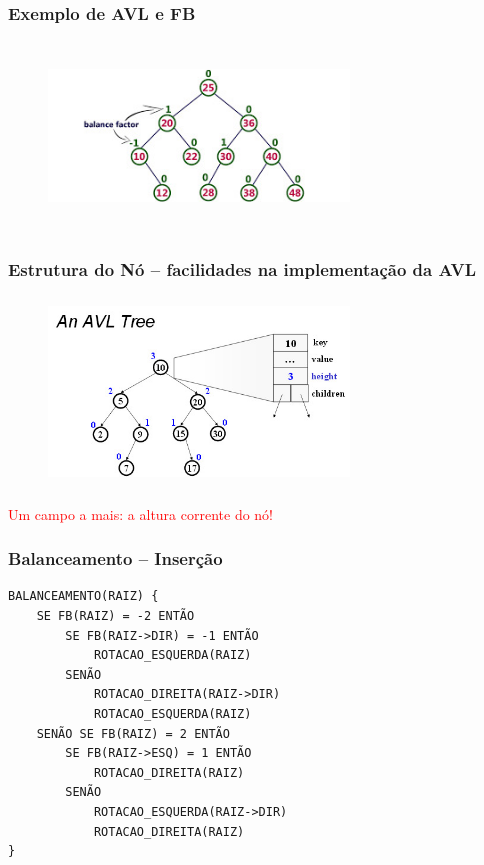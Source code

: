 

\begin{frame}[fragile]
  \frametitle{Exemplo de AVL e FB}
  
   \begin{figure}[tbp]
    \includegraphics[width=8cm, height=5cm]{figs/fig_arvores/AVL-tree-example_FB.jpg}
    \centering
    \end{figure}

 \end{frame}


\begin{frame}[fragile]
  \frametitle{Estrutura do Nó -- facilidades na implementação da AVL}
  
   \begin{figure}[tbp]
    \includegraphics[width=8cm, height=5cm]{figs/fig_arvores/AVL-data_structure.jpg}
    \centering
    \end{figure}

\textcolor{red}{Um campo a mais: a altura corrente do nó!}

\end{frame}


\begin{frame}[fragile]
\frametitle{Balanceamento -- Inserção}
\begin{verbatim}
BALANCEAMENTO(RAIZ) {
    SE FB(RAIZ) = -2 ENTÃO
        SE FB(RAIZ->DIR) = -1 ENTÃO
            ROTACAO_ESQUERDA(RAIZ)
        SENÃO
            ROTACAO_DIREITA(RAIZ->DIR)
            ROTACAO_ESQUERDA(RAIZ) 
    SENÃO SE FB(RAIZ) = 2 ENTÃO
        SE FB(RAIZ->ESQ) = 1 ENTÃO
            ROTACAO_DIREITA(RAIZ)
        SENÃO
            ROTACAO_ESQUERDA(RAIZ->DIR)
            ROTACAO_DIREITA(RAIZ)
}
\end{verbatim}
\end{frame}


